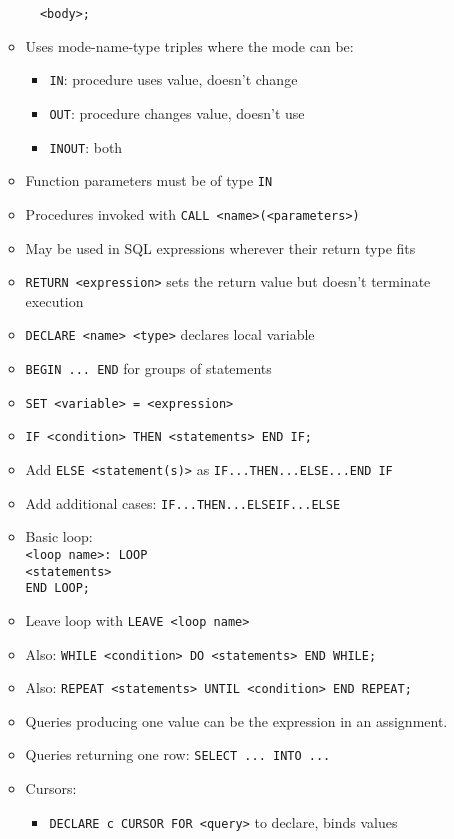 \documentclass[landscape,8pt]{extarticle}
\newcommand{\code}{\lstinline}
\begin{document}
\begin{multicols}{4}
\begin{itemize}
\begin{itemize}
\code{  <body>;}
        \item Uses mode-name-type triples where the mode can be:
        \begin{itemize}
            \item \code{IN}: procedure uses value, doesn't change 
            \item \code{OUT}: procedure changes value, doesn't use
            \item \code{INOUT}: both
        \end{itemize}
        \item Function parameters must be of type \code{IN}
        \item Procedures invoked with \code{CALL <name>(<parameters>)}
        \item May be used in SQL expressions wherever their return type fits
        \item \code{RETURN <expression>} sets the return value but doesn't terminate execution
        \item \code{DECLARE <name> <type>} declares local variable
        \item \code{BEGIN ... END} for groups of statements
        \item \code{SET <variable> = <expression>}
        \item \code{IF <condition> THEN <statements> END IF;}
        \item Add \code{ELSE <statement(s)>} as \code{IF...THEN...ELSE...END IF}
        \item Add additional cases: \code{IF...THEN...ELSEIF...ELSE}
        \item Basic loop:\\
\code{<loop name>: LOOP}\\
\code{<statements>}\\
\code{END LOOP;}
        \item Leave loop with \code{LEAVE <loop name>}
        \item Also: \code{WHILE <condition> DO <statements> END WHILE;}
        \item Also: \code{REPEAT <statements> UNTIL <condition> END REPEAT;}
        \item Queries producing one value can be the expression in an assignment.
        \item Queries returning one row: \code{SELECT ... INTO ...}
        \item Cursors:
        \begin{itemize}
            \item \code{DECLARE c CURSOR FOR <query>} to declare, binds values

\end{itemize}
\end{itemize}
\end{itemize}
\end{multicols}
\end{document}
